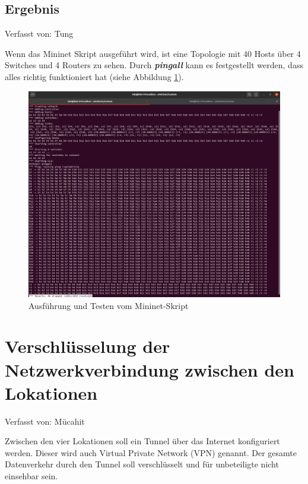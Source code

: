 \documentclass[fontsize=12pt,paper=a4,open=any,parskip=half,
  twoside=false,toc=listof,toc=bibliography,fleqn,leqno,
  captions=nooneline,captions=tableabove,british]{scrbook}
\begin{document}
\subsection{Ergebnis}
{\tiny Verfasst von: Tung\par}
Wenn das Mininet Skript ausgeführt wird, ist eine Topologie mit 40 Hosts über 4 Switches und 4 Routers zu sehen. Durch \textit{\textbf{pingall}} kann es festgestellt werden, dass alles richtig funktioniert hat (siehe Abbildung \ref{pingall}).

\begin{figure}[H]
 \centering
 \includegraphics[width=1.0\textwidth]{Bilder/pingall}
 \captionsetup{justification=centering,margin=1cm}
 \caption{Ausführung und Testen vom Mininet-Skript}
 \label{pingall}
\end{figure}

\newpage
\section{Verschlüsselung der Netzwerkverbindung zwischen den Lokationen}
{\tiny Verfasst von: Mücahit\par}
Zwischen den vier Lokationen soll ein Tunnel über das Internet konfiguriert werden. Dieser wird auch Virtual Private Network (VPN) genannt. Der gesamte Datenverkehr durch den Tunnel soll verschlüsselt und für unbeteiligte nicht einsehbar sein.
\end{document}
